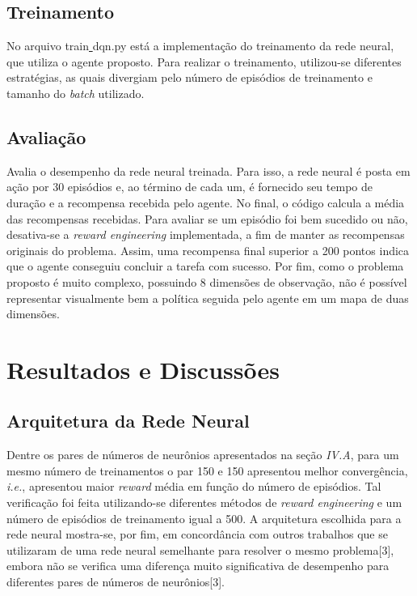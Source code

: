 \documentclass[letterpaper, 10 pt, conference]{ieeeconf}  %
\begin{document}
\subsection{Treinamento}
No arquivo train\underline{ }dqn.py está a implementação do treinamento da rede neural, que utiliza o agente proposto. Para realizar o treinamento, utilizou-se diferentes estratégias, as quais divergiam pelo número de episódios de treinamento e tamanho do \emph{batch} utilizado.  

\subsection{Avaliação}
Avalia o desempenho da rede neural treinada. Para isso, a rede neural é posta em ação por 30 episódios e, ao término de cada um, é fornecido seu tempo de duração e a recompensa recebida pelo agente. No final, o código calcula a média das recompensas recebidas. Para avaliar se um episódio foi bem sucedido ou não, desativa-se a \emph{reward engineering} implementada, a fim de manter as recompensas originais do problema. Assim, uma recompensa final superior a 200 pontos indica que o agente conseguiu concluir a tarefa com sucesso. Por fim, como o problema proposto é muito complexo, possuindo 8 dimensões de observação, não é possível representar visualmente bem a política seguida pelo agente em um mapa de duas dimensões. 

\section{Resultados e Discussões}

\subsection{Arquitetura da Rede Neural}
Dentre os pares de números de neurônios apresentados na seção \emph{IV.A}, para um mesmo número de treinamentos o par 150 e 150 apresentou melhor convergência, \emph{i.e.}, apresentou maior \emph{reward} média em função do número de episódios. Tal verificação foi feita utilizando-se diferentes métodos de \emph{reward engineering} e um número de episódios de treinamento igual a 500. 
A arquitetura escolhida para a rede neural mostra-se, por fim, em concordância com outros trabalhos que se utilizaram de uma rede neural semelhante para resolver o mesmo problema[3], embora não se verifica uma diferença muito significativa de desempenho para diferentes pares de números de neurônios[3].
\end{document}
